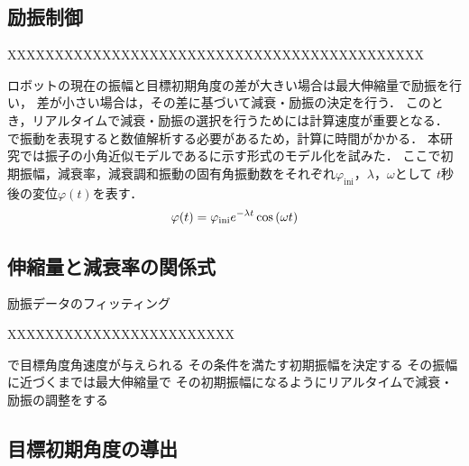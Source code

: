         \subsection{励振制御}
        XXXXXXXXXXXXXXXXXXXXXXXXXXXXXXXXXXXXXXXXXXXX





          ロボットの現在の振幅と目標初期角度の差が大きい場合は最大伸縮量で励振を行い，
          差が小さい場合は，その差に基づいて減衰・励振の決定を行う．
          このとき，リアルタイムで減衰・励振の選択を行うためには計算速度が重要となる．
          で振動を表現すると数値解析する必要があるため，計算に時間がかかる．
          本研究では振子の小角近似モデルであるに示す形式のモデル化を試みた．
          ここで初期振幅，減衰率，減衰調和振動の固有角振動数をそれぞれ$\varphi_{\mathrm{ini}}$，$\lambda$，$\omega$として
          $t$秒後の変位$\varphi(t)$を表す．
          \begin{eqnarray}
            \equlabel{Approximation Model}
            \varphi(t)=\varphi_{\mathrm{ini}}e^{-\lambda t}\cos{(\omega t)}
          \end{eqnarray}
          

        \subsection{伸縮量と減衰率の関係式}
        励振データのフィッティング

          XXXXXXXXXXXXXXXXXXXXXXXX
          
          で目標角度角速度が与えられる
          その条件を満たす初期振幅を決定する
          その振幅に近づくまでは最大伸縮量で
          その初期振幅になるようにリアルタイムで減衰・励振の調整をする

          
        \subsection{目標初期角度の導出}
          
